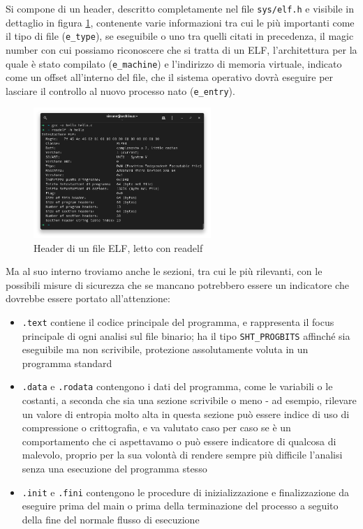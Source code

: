 Si compone di un header, descritto completamente nel file \texttt{sys/elf.h} e visibile in dettaglio in figura \ref{fig:elf_header}, contenente varie informazioni tra cui le più importanti come il tipo di file (\texttt{e\_type}), se eseguibile o uno tra quelli citati in precedenza,
il magic number con cui possiamo riconoscere che si tratta di un ELF,
l'architettura per la quale è stato compilato (\texttt{e\_machine})
e l'indirizzo di memoria virtuale, indicato come un offset all'interno del file, che il sistema operativo dovrà eseguire per lasciare il controllo al nuovo processo nato (\texttt{e\_entry}).

\begin{figure}[!htb]
    \centering
    \includegraphics[width=0.6\textwidth]{assets/elf_header.png}
    \caption{Header di un file ELF, letto con readelf}
    \label{fig:elf_header}
\end{figure}

Ma al suo interno troviamo anche le sezioni, tra cui le più rilevanti, con le possibili misure di sicurezza che se mancano potrebbero essere un indicatore che dovrebbe essere portato all'attenzione: \cite{forensic_friday_execs}
\begin{itemize}
    \item \texttt{.text} contiene il codice principale del programma, e rappresenta il focus principale di ogni analisi sul file binario; ha il tipo \texttt{SHT\_PROGBITS} affinché sia eseguibile ma non scrivibile, protezione assolutamente voluta in un programma standard
    \item \texttt{.data} e \texttt{.rodata} contengono i dati del programma, come le variabili o le costanti, a seconda che sia una sezione scrivibile o meno - ad esempio, rilevare un valore di entropia molto alta in questa sezione può essere indice di uso di compressione o crittografia, e va valutato caso per caso se è un comportamento che ci aspettavamo o può essere indicatore di qualcosa di malevolo, proprio per la sua volontà di rendere sempre più difficile l'analisi senza una esecuzione del programma stesso
    \item \texttt{.init} e \texttt{.fini} contengono le procedure di inizializzazione e finalizzazione da eseguire prima del main o prima della terminazione del processo a seguito della fine del normale flusso di esecuzione
\end{itemize}

